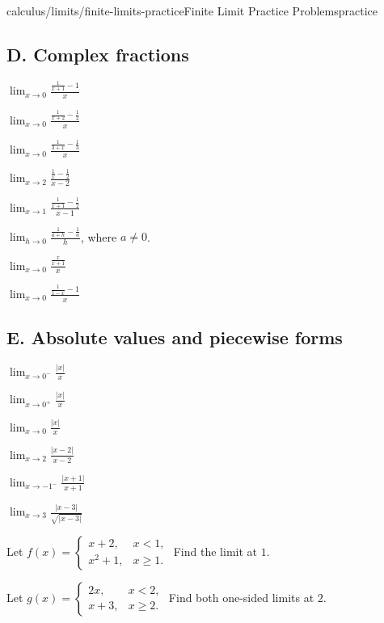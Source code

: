 \documentclass[11pt,openany]{book}
\theoremstyle{bgplain}
\begin{document}
\begin{webpage}{calculus/limits/finite-limits-practice}{Finite Limit Practice Problems}{practice}
\subsection*{D. Complex fractions}
\begin{bgexercises}[label=\textbf{2.\arabic*},resume]
  \item \(\displaystyle\lim_{x\to0}\frac{\frac1{x+1}-1}{x}\)
  \item \(\displaystyle\lim_{x\to0}\frac{\frac1{x+2}-\frac12}{x}\)
  \item \(\displaystyle\lim_{x\to0}\frac{\frac1{3+x}-\frac13}{x}\)
  \item \(\displaystyle\lim_{x\to2}\frac{\frac1x-\frac12}{x-2}\)
  \item \(\displaystyle\lim_{x\to1}\frac{\frac1{x+1}-\frac12}{x-1}\)
  \item \(\displaystyle\lim_{h\to0}\frac{\frac1{a+h}-\frac1a}{h}\), where \(a\ne0\).
  \item \(\displaystyle\lim_{x\to0}\frac{\frac{x}{x+1}}{x}\)
  \item \(\displaystyle\lim_{x\to0}\frac{\frac1{1-x}-1}{x}\)
\end{bgexercises}

\subsection*{E. Absolute values and piecewise forms}
\begin{bgexercises}[label=\textbf{2.\arabic*},resume]
  \item \(\displaystyle\lim_{x\to0^-}\frac{|x|}{x}\)
  \item \(\displaystyle\lim_{x\to0^+}\frac{|x|}{x}\)
  \item \(\displaystyle\lim_{x\to0}\frac{|x|}{x}\)
  \item \(\displaystyle\lim_{x\to2}\frac{|x-2|}{x-2}\)
  \item \(\displaystyle\lim_{x\to-1^-}\frac{|x+1|}{x+1}\)
  \item \(\displaystyle\lim_{x\to3}\frac{|x-3|}{\sqrt{|x-3|}}\)
  \item Let \(f(x)=\begin{cases}x+2,&x<1,\\x^2+1,&x\ge1.\end{cases}\) Find the limit at \(1\).
  \item Let \(g(x)=\begin{cases}2x,&x<2,\\x+3,&x\ge2.\end{cases}\) Find both one-sided limits at \(2\).
\end{bgexercises}


\end{webpage}
\end{document}
